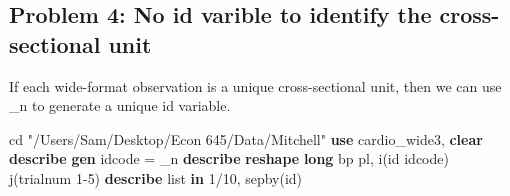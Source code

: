 \documentclass[
]{book}
\newenvironment{Shaded}{\begin{snugshade}}{\end{snugshade}}
\newcommand{\DataTypeTok}[1]{\textcolor[rgb]{0.13,0.29,0.53}{#1}}
\newcommand{\KeywordTok}[1]{\textcolor[rgb]{0.13,0.29,0.53}{\textbf{#1}}}
\newcommand{\NormalTok}[1]{#1}
\newcommand{\OtherTok}[1]{\textcolor[rgb]{0.56,0.35,0.01}{#1}}
\newcommand{\StringTok}[1]{\textcolor[rgb]{0.31,0.60,0.02}{#1}}
\begin{document}
\subsection*{Problem 4: No id varible to identify the cross-sectional unit}\label{problem-4-no-id-varible-to-identify-the-cross-sectional-unit}

If each wide-format observation is a unique cross-sectional unit, then we can use \_n to generate a unique id variable.

\begin{Shaded}
\begin{Highlighting}[]
\NormalTok{cd }\StringTok{"/Users/Sam/Desktop/Econ 645/Data/Mitchell"}
\KeywordTok{use}\NormalTok{ cardio\_wide3, }\KeywordTok{clear}
\KeywordTok{describe}
\KeywordTok{gen}\NormalTok{ idcode = }\DataTypeTok{\_n}
\KeywordTok{describe}
\KeywordTok{reshape} \KeywordTok{long}\NormalTok{ bp pl, i(id idcode) j(trialnum 1{-}5)}
\KeywordTok{describe}
\OtherTok{list} \KeywordTok{in}\NormalTok{ 1/10, sepby(id)}
\end{Highlighting}
\end{Shaded}
\end{document}
